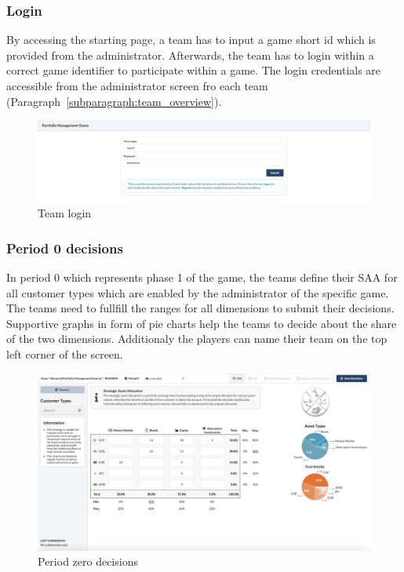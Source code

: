 \subsubsection{Login}
By accessing the starting page, a team has to input a game short id which is provided from the administrator. Afterwards, the team has to login within a correct game identifier to participate within a game. The login credentials are accessible from the administrator screen fro each team (Paragraph~\ref{subparagraph:team_overview}).
\begin{figure}[h!]
  \centering
  \includegraphics[scale=0.2]{img/application-overview/teams/01_login.png}
  \caption{Team login}
\end{figure}

\subsubsection{Period 0 decisions}
In period 0 which represents phase 1 of the game, the teams define their SAA for all customer types which are enabled by the administrator of the specific game. The teams need to fullfill the ranges for all dimensions to submit their decisions. Supportive graphs in form of pie charts help the teams to decide about the share of the two dimensions. Additionaly the players can name their team on the top left corner of the screen.
\begin{figure}[h!]
  \centering
  \includegraphics[scale=0.2]{img/application-overview/teams/02_period_zero_decisions.png}
  \caption{Period zero decisions}
\end{figure}

